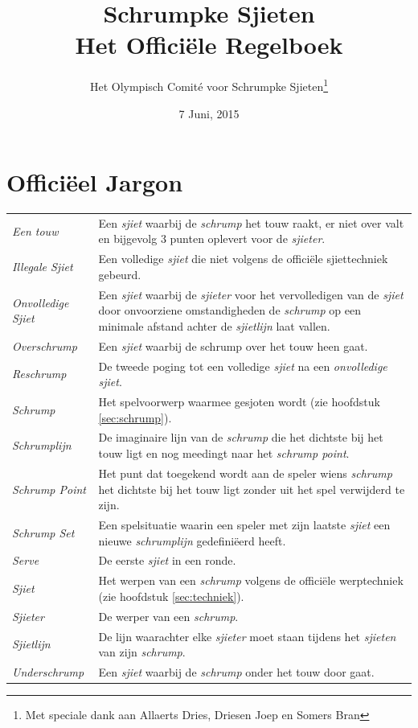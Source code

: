 \documentclass[a4paper,12pt,titlepage]{article}
\begin{document}
\title{Schrumpke Sjieten \\ \large Het Offici\"ele Regelboek}

\date{7 Juni, 2015}
\author{Het Olympisch Comit\'e voor Schrumpke Sjieten\thanks{Met speciale dank aan Allaerts Dries, Driesen Joep en Somers Bran}}
\maketitle

\tableofcontents
\newpage

\section{Offici\"eel Jargon}

{\renewcommand{\arraystretch}{1.8}
\begin{tabularx}{\textwidth}{lX}

\textit{Een touw} & Een \textit{sjiet} waarbij de \textit{schrump} het touw raakt, er niet over valt en bijgevolg 3 punten oplevert voor de \textit{sjieter}. \\
\textit{Illegale Sjiet} & Een volledige \textit{sjiet} die niet volgens de offici\"ele sjiettechniek gebeurd. \\
\textit{Onvolledige Sjiet} & Een \textit{sjiet} waarbij de \textit{sjieter} voor het vervolledigen van de \textit{sjiet} door onvoorziene omstandigheden de \textit{schrump} op een minimale afstand achter de \textit{sjietlijn} laat vallen. \\
\textit{Overschrump} & Een \textit{sjiet} waarbij de schrump over het touw heen gaat. \\
\textit{Reschrump} & De tweede poging tot een volledige \textit{sjiet} na een \textit{onvolledige sjiet}. \\
\textit{Schrump} & Het spelvoorwerp waarmee gesjoten wordt (zie hoofdstuk \ref{sec:schrump}). \\
\textit{Schrumplijn} & De imaginaire lijn van de \textit{schrump} die het dichtste bij het touw ligt en nog meedingt naar het \textit{schrump point}.\\
\textit{Schrump Point} & Het punt dat toegekend wordt aan de speler wiens \textit{schrump} het dichtste bij het touw ligt zonder uit het spel verwijderd te zijn. \\
\textit{Schrump Set} & Een spelsituatie waarin een speler met zijn laatste \textit{sjiet} een nieuwe \textit{schrumplijn} gedefini\"eerd heeft. \\
\textit{Serve} & De eerste \textit{sjiet} in een ronde. \\
\textit{Sjiet} & Het werpen van een \textit{schrump} volgens de offici\"ele werptechniek (zie hoofdstuk \ref{sec:techniek}). \\
\textit{Sjieter} & De werper van een \textit{schrump}. \\
\textit{Sjietlijn} & De lijn waarachter elke \textit{sjieter} moet staan tijdens het \textit{sjieten} van zijn \textit{schrump}. \\
\textit{Underschrump} & Een \textit{sjiet} waarbij de \textit{schrump} onder het touw door gaat. \\

\end{tabularx}
}
\end{document}
